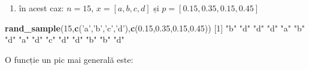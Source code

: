 \documentclass[]{article}
\newenvironment{Shaded}{\begin{snugshade}}{\end{snugshade}}
\newcommand{\KeywordTok}[1]{\textcolor[rgb]{0.13,0.29,0.53}{\textbf{#1}}}
\newcommand{\DecValTok}[1]{\textcolor[rgb]{0.00,0.00,0.81}{#1}}
\newcommand{\FloatTok}[1]{\textcolor[rgb]{0.00,0.00,0.81}{#1}}
\newcommand{\StringTok}[1]{\textcolor[rgb]{0.31,0.60,0.02}{#1}}
\newcommand{\NormalTok}[1]{#1}
\providecommand{\tightlist}{%
  \setlength{\itemsep}{0pt}\setlength{\parskip}{0pt}}
\begin{document}
\begin{enumerate}
\def\labelenumi{\arabic{enumi}.}
\setcounter{enumi}{1}
\tightlist
\item
  în acest caz: \(n=15\), \(x=[a,b,c,d]\) și \(p=[0.15,0.35,0.15,0.45]\)
\end{enumerate}

\begin{Shaded}
\begin{Highlighting}[]
\KeywordTok{rand_sample}\NormalTok{(}\DecValTok{15}\NormalTok{,}\KeywordTok{c}\NormalTok{(}\StringTok{'a'}\NormalTok{,}\StringTok{'b'}\NormalTok{,}\StringTok{'c'}\NormalTok{,}\StringTok{'d'}\NormalTok{),}\KeywordTok{c}\NormalTok{(}\FloatTok{0.15}\NormalTok{,}\FloatTok{0.35}\NormalTok{,}\FloatTok{0.15}\NormalTok{,}\FloatTok{0.45}\NormalTok{))}
\NormalTok{ [}\DecValTok{1}\NormalTok{] }\StringTok{"b"} \StringTok{"d"} \StringTok{"d"} \StringTok{"d"} \StringTok{"a"} \StringTok{"b"} \StringTok{"d"} \StringTok{"a"} \StringTok{"d"} \StringTok{"c"} \StringTok{"d"} \StringTok{"d"} \StringTok{"b"} \StringTok{"b"} \StringTok{"d"}
\end{Highlighting}
\end{Shaded}

O funcție un pic mai generală este:
\end{document}
